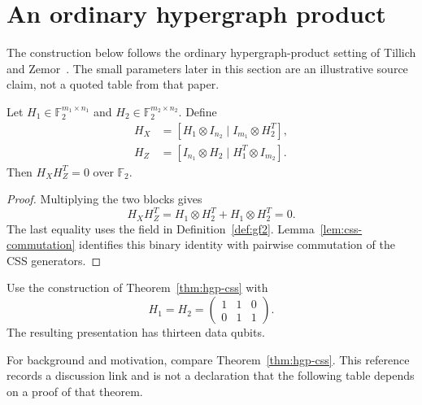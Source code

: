\section{An ordinary hypergraph product}
\label{sec:hgp}

The construction below follows the ordinary hypergraph-product setting
of Tillich and Zemor~\cite{TillichZemor2009}. The small parameters later
in this section are an illustrative source claim, not a quoted table
from that paper.

\begin{thm}
\label{thm:hgp-css}
Let $H_1\in\mathbb{F}_2^{m_1\times n_1}$ and
$H_2\in\mathbb{F}_2^{m_2\times n_2}$. Define
\begin{align}
\label{eq:hgp-checks}
H_X&=[H_1\otimes I_{n_2}\mid I_{m_1}\otimes H_2^T],\\
H_Z&=[I_{n_1}\otimes H_2\mid H_1^T\otimes I_{m_2}].
\end{align}
Then $H_XH_Z^T=0$ over $\mathbb{F}_2$.
\end{thm}

\begin{proof}
\label{proof:hgp-css}
Multiplying the two blocks gives
\begin{equation}
\label{eq:hgp-commutation}
H_XH_Z^T=H_1\otimes H_2^T+H_1\otimes H_2^T=0.
\end{equation}
The last equality uses the field in Definition~\ref{def:gf2}.
Lemma~\ref{lem:css-commutation} identifies this binary identity with
pairwise commutation of the CSS generators.
\end{proof}

\begin{thm}
\label{thm:hgp-length}
Use the construction of Theorem~\ref{thm:hgp-css} with
\begin{equation}
\label{eq:repetition-seed}
H_1=H_2=
\begin{pmatrix}
1&1&0\\
0&1&1
\end{pmatrix}.
\end{equation}
The resulting presentation has thirteen data qubits.
\end{thm}

For background and motivation, compare Theorem~\ref{thm:hgp-css}.
This reference records a discussion link and is not a declaration
that the following table depends on a proof of that theorem.

